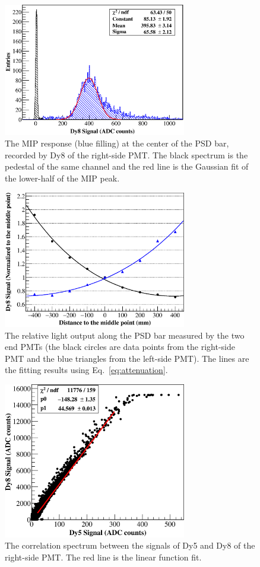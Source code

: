 \documentclass[preprint, times]{elsarticle}
\begin{document}
\begin{figure}[h]
	\centering
	\includegraphics[width=80mm]{mip}
	\caption{The MIP response (blue filling) at the center of the PSD bar, recorded by Dy8 of the right-side PMT. The black spectrum is the pedestal of the same channel and the red line is the Gaussian fit of the lower-half of the MIP peak.}
	\label{fig:mip}
\end{figure}

\begin{figure}[h]
	\centering
	\includegraphics[width=80mm]{attenuation}
	\caption{The relative light output along the PSD bar measured by the two end PMTs (the black circles are data points from the right-side PMT and the blue triangles from the left-side PMT). The lines are the fitting results using Eq.~\ref{eq:attenuation}.}
	\label{fig:attenuation}
\end{figure}

\begin{figure}[h]
	\centering
	\includegraphics[width=80mm]{dy58}
	\caption{The correlation spectrum between the signals of Dy5 and Dy8 of the right-side PMT. The red line is the linear function fit.}
	\label{fig:dy58}
\end{figure}
\end{document}
